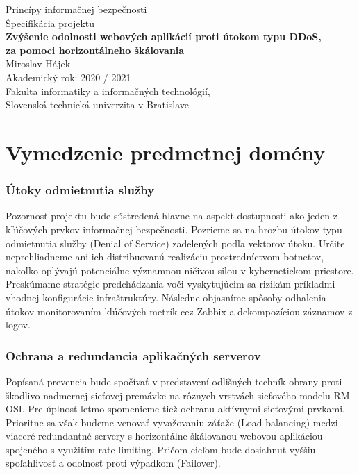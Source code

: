 \documentclass[11pt, a4paper]{article}
\begin{document}
\begin{titlepage}
    \hspace{0pt}
    \centering
    \vfill
    \large Princípy informačnej bezpečnosti \\
    \vspace{0.4cm}
    \Large Špecifikácia projektu \\
    \vspace{1cm}
    \Large \textbf{Zvýšenie odolnosti webových aplikácií proti útokom typu DDoS, 
          \\za pomoci horizontálneho škálovania  \\}
    \vspace{2.5cm}
    \normalsize Miroslav Hájek \\[0.2cm]
	Akademický rok: 2020 / 2021 \\[0.1cm]
	Fakulta informatiky a informačných technológií, \\
	Slovenská technická univerzita v Bratislave
    \vfill
\end{titlepage}

{}
\setcounter{page}{1}

\section*{Vymedzenie predmetnej domény}

\subsubsection*{Útoky odmietnutia služby}
Pozornosť projektu bude sústredená hlavne na aspekt dostupnosti ako jeden z kľúčových prvkov 
informačnej bezpečnosti. Pozrieme sa na hrozbu útokov typu odmietnutia služby (Denial of Service) zadelených 
podľa vektorov útoku. Určite neprehliadneme ani ich distribuovanú realizáciu prostredníctvom 
botnetov, nakoľko oplývajú potenciálne významnou ničivou silou v kybernetickom priestore. Preskúmame 
stratégie predchádzania voči vyskytujúcim sa rizikám príkladmi vhodnej konfigurácie infraštruktúry. Následne 
objasníme spôsoby odhalenia útokov monitorovaním kľúčových metrík cez Zabbix a dekompozíciou záznamov z 
logov. 

\subsubsection*{Ochrana a redundancia aplikačných serverov}
Popísaná prevencia bude spočívať v predstavení odlišných techník obrany proti škodlivo nadmernej sieťovej 
premávke na rôznych vrstvách sieťového modelu RM OSI. Pre úplnosť letmo spomenieme tiež ochranu aktívnymi 
sieťovými prvkami. Prioritne sa však budeme venovať vyvažovaniu záťaže (Load balancing) medzi viaceré redundantné servery s horizontálne škálovanou webovou aplikáciou spojeného s využitím rate limiting. Pričom cieľom bude dosiahnuť vyššiu spoľahlivosť a odolnosť proti výpadkom (Failover). 
\end{document}
